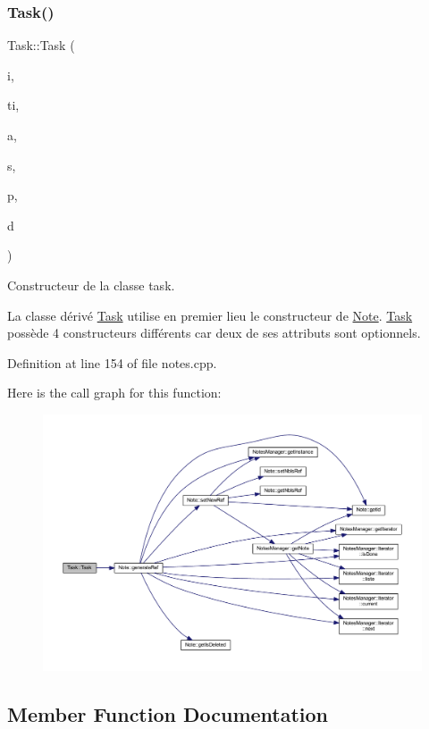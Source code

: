 \subsubsection{\texorpdfstring{Task()}{Task()}}
{\footnotesize\ttfamily Task\+::\+Task (\begin{DoxyParamCaption}\item[{const Q\+String \&}]{i,  }\item[{const Q\+String \&}]{ti,  }\item[{const Q\+String \&}]{a,  }\item[{E\+N\+U\+M\+::\+Status\+Type}]{s,  }\item[{unsigned int}]{p,  }\item[{const Q\+Date\+Time}]{d }\end{DoxyParamCaption})}



Constructeur de la classe task. 

La classe dérivé \hyperlink{class_task}{Task} utilise en premier lieu le constructeur de \hyperlink{class_note}{Note}. \hyperlink{class_task}{Task} possède 4 constructeurs différents car deux de ses attributs sont optionnels. 

Definition at line 154 of file notes.\+cpp.

Here is the call graph for this function\+:\nopagebreak
\begin{figure}[H]
\begin{center}
\leavevmode
\includegraphics[width=350pt]{class_task_a08a0f57803d8ef35f687f23f759e9f0c_cgraph}
\end{center}
\end{figure}


\subsection{Member Function Documentation}
\mbox{\label{class_task_a3c99152a4a000b4b3ae8a50b2c450825}} 

